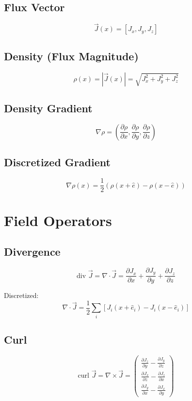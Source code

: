 \documentclass[
  11pt,
  letterpaper,
  twoside,
  openright]{book}
\begin{document}
\subsection{Flux Vector}\label{flux-vector}

\[
\vec{J}(x) = [J_x, J_y, J_z]
\]

\subsection{Density (Flux Magnitude)}\label{density-flux-magnitude}

\[
\rho(x) = |\vec{J}(x)| = \sqrt{J_x^2 + J_y^2 + J_z^2}
\]

\subsection{Density Gradient}\label{density-gradient}

\[
\nabla\rho = \left(\frac{\partial\rho}{\partial x}, \frac{\partial\rho}{\partial y}, \frac{\partial\rho}{\partial z}\right)
\]

\subsection{Discretized Gradient}\label{discretized-gradient}

\[
\nabla\rho(x) = \frac{1}{2}\left(\rho(x+\hat{e}) - \rho(x-\hat{e})\right)
\]

\section{Field Operators}\label{field-operators}

\subsection{Divergence}\label{divergence}

\[
\text{div } \vec{J} = \nabla \cdot \vec{J} = \frac{\partial J_x}{\partial x} + \frac{\partial J_y}{\partial y} + \frac{\partial J_z}{\partial z}
\]

Discretized: \[
\nabla \cdot \vec{J} = \frac{1}{2}\sum_i \left[J_i(x+\hat{e}_i) - J_i(x-\hat{e}_i)\right]
\]

\subsection{Curl}\label{curl}

\[
\text{curl } \vec{J} = \nabla \times \vec{J} = \begin{pmatrix} \frac{\partial J_z}{\partial y} - \frac{\partial J_y}{\partial z} \\ \frac{\partial J_x}{\partial z} - \frac{\partial J_z}{\partial x} \\ \frac{\partial J_y}{\partial x} - \frac{\partial J_x}{\partial y} \end{pmatrix}
\]
\end{document}
